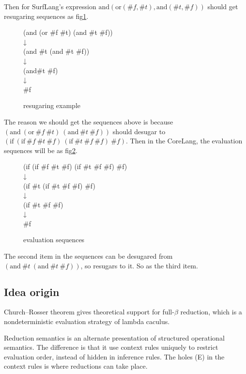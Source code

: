 Then for SurfLang's expression $\mbox{and}(\mbox{or}(\#f, \#t), \mbox{and}(\#t, \#f))$ should get resugaring sequences as fig\ref{fig:example}.

\begin{figure}[ht]
\parbox[t]{\textwidth}{
			\begin{center}  
				(and (or \#f \#t) (and \#t \#f))\\
				↓\\
				(and \#t (and \#t \#f))\\
				↓\\
				(and\#t \#f)\\
				↓\\
				\#f
			\end{center}  
		}
\caption{resugaring example}
\label{fig:example}
\end{figure}

The reason we should get the sequences above is because $(\mbox{and}~(\mbox{or}~\#f~\#t)~(\mbox{and}~\#t~\#f))$ should desugar to $(\mbox{if}~(\mbox{if}~\#f~\#t~\#f)~(\mbox{if}~\#t~\#f~\#f)~\#f)$. Then in the CoreLang, the evaluation sequences will be as fig\ref{fig:coreseq}.

\begin{figure}[ht]
\parbox[t]{\textwidth}{
			\begin{center}  
				(if (if \#f \#t \#f) (if \#t \#f \#f) \#f)\\
				↓\\
				(if \#t (if \#t \#f \#f) \#f)\\
				↓\\
				(if \#t \#f \#f)\\
				↓\\
				\#f
			\end{center}  
		}
\caption{evaluation sequences}
\label{fig:coreseq}
\end{figure}

The second item in the sequences can be desugared from $(\mbox{and}~\#t~(\mbox{and}~\#t~\#f))$, so resugars to it. So as the third item.
\subsection{Idea origin}
Church–Rosser theorem\cite{churchrosser} gives theoretical support for full-$\beta$ reduction, which is a nondeterministic evaluation strategy of lambda caculus. 

Reduction semantics\cite{reduction} is an alternate presentation of structured operational semantics\cite{PLOTKIN}. The difference is that it use context rules uniquely to restrict evaluation order, instead of hidden in inference rules. The holes (E) in the context rules is where reductions can take place.

